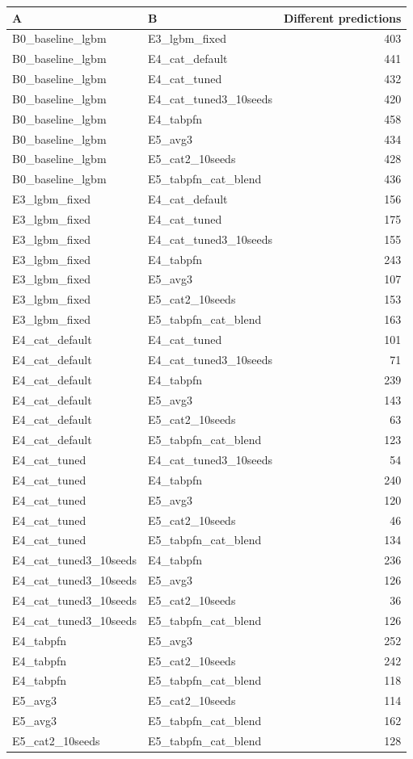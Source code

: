 \begin{tabular}{llr}
\toprule
A & B & Different predictions \\
\midrule
B0_baseline_lgbm & E3_lgbm_fixed & 403 \\
B0_baseline_lgbm & E4_cat_default & 441 \\
B0_baseline_lgbm & E4_cat_tuned & 432 \\
B0_baseline_lgbm & E4_cat_tuned3_10seeds & 420 \\
B0_baseline_lgbm & E4_tabpfn & 458 \\
B0_baseline_lgbm & E5_avg3 & 434 \\
B0_baseline_lgbm & E5_cat2_10seeds & 428 \\
B0_baseline_lgbm & E5_tabpfn_cat_blend & 436 \\
E3_lgbm_fixed & E4_cat_default & 156 \\
E3_lgbm_fixed & E4_cat_tuned & 175 \\
E3_lgbm_fixed & E4_cat_tuned3_10seeds & 155 \\
E3_lgbm_fixed & E4_tabpfn & 243 \\
E3_lgbm_fixed & E5_avg3 & 107 \\
E3_lgbm_fixed & E5_cat2_10seeds & 153 \\
E3_lgbm_fixed & E5_tabpfn_cat_blend & 163 \\
E4_cat_default & E4_cat_tuned & 101 \\
E4_cat_default & E4_cat_tuned3_10seeds & 71 \\
E4_cat_default & E4_tabpfn & 239 \\
E4_cat_default & E5_avg3 & 143 \\
E4_cat_default & E5_cat2_10seeds & 63 \\
E4_cat_default & E5_tabpfn_cat_blend & 123 \\
E4_cat_tuned & E4_cat_tuned3_10seeds & 54 \\
E4_cat_tuned & E4_tabpfn & 240 \\
E4_cat_tuned & E5_avg3 & 120 \\
E4_cat_tuned & E5_cat2_10seeds & 46 \\
E4_cat_tuned & E5_tabpfn_cat_blend & 134 \\
E4_cat_tuned3_10seeds & E4_tabpfn & 236 \\
E4_cat_tuned3_10seeds & E5_avg3 & 126 \\
E4_cat_tuned3_10seeds & E5_cat2_10seeds & 36 \\
E4_cat_tuned3_10seeds & E5_tabpfn_cat_blend & 126 \\
E4_tabpfn & E5_avg3 & 252 \\
E4_tabpfn & E5_cat2_10seeds & 242 \\
E4_tabpfn & E5_tabpfn_cat_blend & 118 \\
E5_avg3 & E5_cat2_10seeds & 114 \\
E5_avg3 & E5_tabpfn_cat_blend & 162 \\
E5_cat2_10seeds & E5_tabpfn_cat_blend & 128 \\
\bottomrule
\end{tabular}
